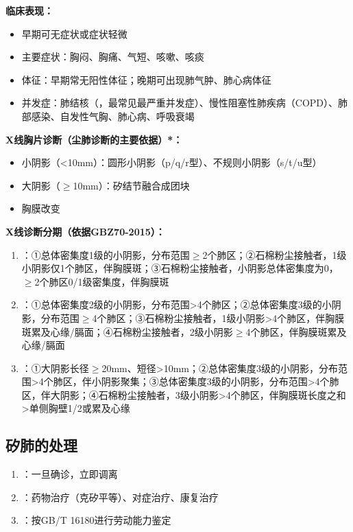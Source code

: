 \begin{keybox}
\textbf{临床表现：}
\begin{itemize}[leftmargin=*]
    \item 早期可无症状或症状轻微
    \item 主要症状：胸闷、胸痛、气短、咳嗽、咳痰
    \item 体征：早期常无阳性体征；晚期可出现肺气肿、肺心病体征
    \item 并发症：肺结核（，最常见最严重并发症）、慢性阻塞性肺疾病（COPD）、肺部感染、自发性气胸、肺心病、呼吸衰竭
\end{itemize}

\textbf{X线胸片诊断（尘肺诊断的主要依据）*：}
\begin{itemize}[leftmargin=*]
    \item 小阴影（<10mm）：圆形小阴影（p/q/r型）、不规则小阴影（s/t/u型）
    \item 大阴影（$\geq$10mm）：矽结节融合成团块
    \item 胸膜改变
\end{itemize}

\textbf{X线诊断分期（依据GBZ70-2015）：}
\begin{enumerate}[leftmargin=*]
    \item {}：①总体密集度1级的小阴影，分布范围$\geq$2个肺区；②石棉粉尘接触者，1级小阴影仅1个肺区，伴胸膜斑；③石棉粉尘接触者，小阴影总体密集度为0，$\geq$2个肺区0/1级密集度，伴胸膜斑
    \item {}：①总体密集度2级的小阴影，分布范围>4个肺区；②总体密集度3级的小阴影，分布范围$\geq$4个肺区；③石棉粉尘接触者，1级小阴影>4个肺区，伴胸膜斑累及心缘/膈面；④石棉粉尘接触者，2级小阴影$\geq$4个肺区，伴胸膜斑累及心缘/膈面
    \item {}：①大阴影长径$\geq$20mm、短径>10mm；②总体密集度3级的小阴影，分布范围>4个肺区，伴小阴影聚集；③总体密集度3级的小阴影，分布范围>4个肺区，伴大阴影；④石棉粉尘接触者，3级小阴影>4个肺区，伴胸膜斑长度之和>单侧胸壁1/2或累及心缘
\end{enumerate}
\end{keybox}

\subsection{矽肺的处理}

\begin{enumerate}[leftmargin=*]
    \item {}：一旦确诊，立即调离
    \item {}：药物治疗（克矽平等）、对症治疗、康复治疗
    \item {}：按GB/T 16180进行劳动能力鉴定
\end{enumerate}

